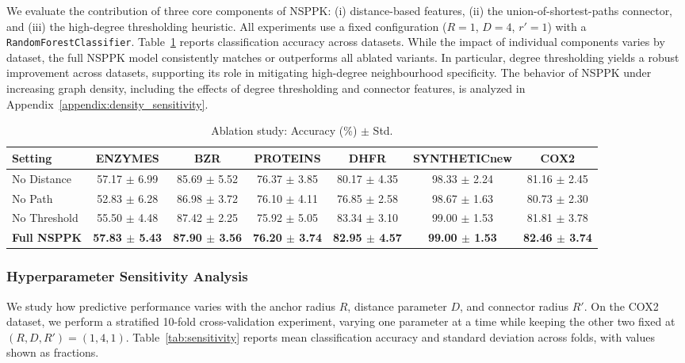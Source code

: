 We evaluate the contribution of three core components of NSPPK:
(i) distance-based features,
(ii) the union-of-shortest-paths connector, and
(iii) the high-degree thresholding heuristic.
All experiments use a fixed configuration ($R=1$, $D=4$, $r'=1$) with a
\texttt{RandomForestClassifier}.
Table~\ref{tab:ablation} reports classification accuracy across datasets.
While the impact of individual components varies by dataset, the full NSPPK
model consistently matches or outperforms all ablated variants.
In particular, degree thresholding yields a robust improvement across datasets,
supporting its role in mitigating high-degree neighbourhood specificity.
The behavior of NSPPK under increasing graph density, including the effects of
degree thresholding and connector features, is analyzed in
Appendix~\ref{appendix:density_sensitivity}.
\begin{table}[H]
\centering
\caption{Ablation study: Accuracy (\%) $\pm$ Std.}
\label{tab:ablation}
\scriptsize
\setlength{\tabcolsep}{3pt}
\begin{adjustbox}{max width=\columnwidth}
\begin{tabular}{lcccccc}
\toprule
\textbf{Setting} & \textbf{ENZYMES} & \textbf{BZR} & \textbf{PROTEINS} & \textbf{DHFR} & \textbf{SYNTHETICnew} & \textbf{COX2} \\
\midrule
No Distance        & 57.17 $\pm$ 6.99 & 85.69 $\pm$ 5.52 & 76.37 $\pm$ 3.85 & 80.17 $\pm$ 4.35 & 98.33 $\pm$ 2.24 & 81.16 $\pm$ 2.45 \\
No Path            & 52.83 $\pm$ 6.28 & 86.98 $\pm$ 3.72 & 76.10 $\pm$ 4.11 & 76.85 $\pm$  2.58 & 98.67 $\pm$ 1.63 & 80.73 $\pm$ 2.30 \\
No Threshold       & 55.50 $\pm$ 4.48 & 87.42 $\pm$ 2.25 & 75.92 $\pm$ 5.05 & 83.34 $\pm$ 3.10 & 99.00 $\pm$ 1.53 & 81.81 $\pm$ 3.78 \\
\textbf{Full NSPPK}& \textbf{57.83 $\pm$ 5.43} & \textbf{87.90 $\pm$ 3.56} & \textbf{76.20 $\pm$ 3.74} & \textbf{82.95 $\pm$ 4.57} & \textbf{99.00 $\pm$ 1.53} & \textbf{82.46 $\pm$ 3.74} \\
\bottomrule
\end{tabular}
\end{adjustbox}
\end{table}
\subsubsection{Hyperparameter Sensitivity Analysis}
\label{sensitivity}


We study how predictive performance varies with the anchor radius $R$, distance
parameter $D$, and connector radius $R'$. On the COX2 dataset, we perform a
stratified 10-fold cross-validation experiment, varying one parameter at a time
while keeping the other two fixed at $(R,D,R')=(1,4,1)$. Table~\ref{tab:sensitivity}
reports mean classification accuracy and standard deviation across folds, with
values shown as fractions.

